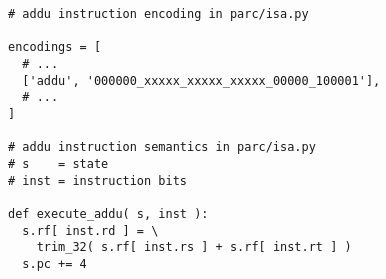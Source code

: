 \documentclass{cbxdoc}
\begin{document}
\begin{landscape}
\begin{minipage}[t]{3.25in}
\begin{lstlisting}[numbers=none,basicstyle=\ttfamily,xleftmargin={0in}]
# addu instruction encoding in parc/isa.py

encodings = [
  # ...
  ['addu', '000000_xxxxx_xxxxx_xxxxx_00000_100001'],
  # ...
]

# addu instruction semantics in parc/isa.py
# s    = state
# inst = instruction bits

def execute_addu( s, inst ):
  s.rf[ inst.rd ] = \
    trim_32( s.rf[ inst.rs ] + s.rf[ inst.rt ] )
  s.pc += 4
\end{lstlisting}

\end{minipage}
\par

\end{landscape}
\end{document}
